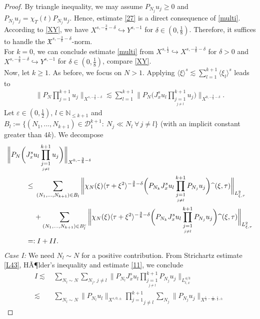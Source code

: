 \documentclass[reqno]{amsart}
\theoremstyle{Definitionl}
\theoremstyle{Definitionk}
\theoremstyle{definition}
\theoremstyle{Satzk}
\theoremstyle{Satzl}
\theoremstyle{Bemerkung}
\begin{document}
\begin{proof}
By triangle inequality, we may assume $P_{N_j}u_j\ge0$ and $P_{N_j}u_j=\chi_T(t)P_{N_j}u_j$. Hence, estimate \eqref{27} is a direct consequence of \eqref{multi}. According to \eqref{XY}, we have $X^{s,-\frac38-\delta}\hookrightarrow Y^{s,-1}$ for $\delta\in(0,\tfrac18)$. Therefore, it suffices to handle the $\mathfrak X^{s,-\frac38-\delta}$-norm. \\[10pt]
For $k=0$, we can conclude estimate \eqref{multi} from $X^{s,\frac12}\hookrightarrow X^{s,-\frac38-\delta}$ for $\delta>0$ and $X^{s,-\frac38-\delta}\hookrightarrow Y^{s,-1}$ for $\delta\in(0,\tfrac18)$, compare \eqref{XY}.\\[10pt]
Now, let $k\ge1$. As before, we focus on $N>1$. Applying $\langle\xi\rangle^s\lesssim \sum_{l=1}^{k+1}\langle\xi_l\rangle^s$ leads to 
\begin{align*}
\Big\|P_N\prod_{j=1}^{k+1}u_j\Big\|_{X^{s,-\frac38-\delta}}\lesssim\sum_{l=1}^{k+1}\bigg\|P_N\Big(J_x^{s}u_l\prod_{\underset{j\ne l}{j=1}}^{k+1}u_j\Big)\bigg\|_{X^{0,-\frac38-\delta}}.
\end{align*}
Let $\varepsilon\in(0,\tfrac12)$, $l\in\mathbb N_{\le k+1}$ and $B_l:=\{(N_1,...,N_{k+1})\in\mathcal D_1^{k+1}:\ N_j\ll N_l\ \forall\,j\ne l\}$ (with an implicit constant greater than $4k$). We decompose
\begin{align*}
\bigg\|P_N\bigg(&J_x^{s}u_l\prod_{\underset{j\ne l}{j=1}}^{k+1}u_j\bigg)\bigg\|_{X^{0,-\frac38-\delta}}\\
&\le\, \sum_{(N_1,...,N_{k+1})\in B_l}\bigg\|\chi_N(\xi)\langle\tau+\xi^2\rangle^{-\frac38-\delta}\bigg(P_{N_k}J_x^{s}u_l\prod_{\underset{j\ne l}{j=1}}^{k+1}P_{N_j}u_j\bigg)\widehat{\textcolor[rgb]{1,1,1}{u}}(\xi,\tau)\bigg\|_{L^2_{\xi,\tau}}\\
&\,\ \ \ +\sum_{(N_1,...,N_{k+1})\in B_l^c}\bigg\|\chi_N(\xi)\langle\tau+\xi^2\rangle^{-\frac38-\delta}\bigg(P_{N_k}J_x^{s}u_l\prod_{\underset{j\ne l}{j=1}}^{k+1}P_{N_j}u_j\bigg)\widehat{\textcolor[rgb]{1,1,1}{u}}(\xi,\tau)\bigg\|_{L^2_{\xi,\tau}}\\
&=: I+II.
\end{align*}
\emph{Case I: } We need $N_l\sim N$ for a positive contribution. From Strichartz estimate \eqref{L43}, HÃ¶lder's inequality and estimate \eqref{11}, we conclude
\begin{align*}
I\lesssim&\, \sum_{N_l\sim N}{\sum_{N_j,\,j\ne l}}\bigg\|P_{N_l}J_x^{s}u_l\prod_{\underset{j\ne l}{j=1}}^{k+1}P_{N_j}u_j\bigg\|_{L^{4/3}_{t,x}}\\
\lesssim&\,\sum_{N_l\sim N}\big\|P_{N_l}u_l\big\|_{X^{s,0,\pm}}\underset{j\ne l}{\prod_{j=1}^{k+1}}\sum_{N_j}\big\|P_{N_j}u_j\big\|_{X^{\frac12-\frac{1}{4k},\frac12,\pm}}

\end{align*}
\end{proof}
\end{document}
